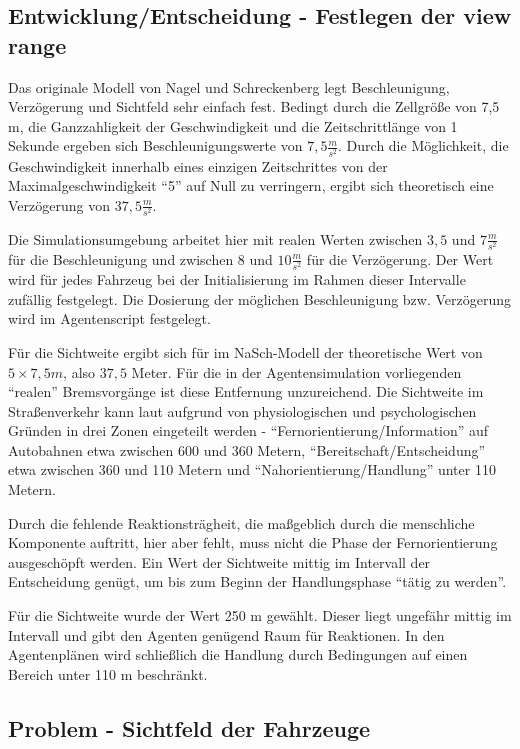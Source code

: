 \subsection{Entwicklung/Entscheidung - Festlegen der view range}

Das originale Modell von Nagel und Schreckenberg legt Beschleunigung, Verzögerung und Sichtfeld sehr einfach fest.
Bedingt durch die Zellgröße von 7,5 m, die Ganzzahligkeit der Geschwindigkeit und die Zeitschrittlänge von 1 Sekunde ergeben sich Beschleunigungswerte von $7,5 \frac{m}{s^{2}}$. 
Durch die Möglichkeit, die Geschwindigkeit innerhalb eines einzigen Zeitschrittes von der Maximalgeschwindigkeit \enquote{5} auf Null zu verringern, ergibt sich theoretisch eine Verzögerung von $37,5 \frac{m}{s^{2}}$.

Die Simulationsumgebung arbeitet hier mit realen Werten zwischen $3,5$ und $7 \frac{m}{s^{2}}$ für die Beschleunigung und zwischen $8$ und $10 \frac{m}{s^{2}}$ für die Verzögerung.
Der Wert wird für jedes Fahrzeug bei der Initialisierung im Rahmen dieser Intervalle zufällig festgelegt.
Die Dosierung der möglichen Beschleunigung bzw. Verzögerung wird im Agentenscript festgelegt.

Für die Sichtweite ergibt sich für im NaSch-Modell der theoretische Wert von $5 \times 7,5 m$, also $37,5$ Meter.
Für die in der Agentensimulation vorliegenden \enquote{realen} Bremsvorgänge ist diese Entfernung unzureichend. 
Die Sichtweite im Straßenverkehr kann laut \cite{sichtweite} aufgrund von physiologischen und psychologischen Gründen in drei Zonen eingeteilt werden - \enquote{Fernorientierung/Information} auf Autobahnen etwa zwischen 600 und 360 Metern, \enquote{Bereitschaft/Entscheidung} etwa zwischen 360 und 110 Metern und \enquote{Nahorientierung/Handlung} unter 110 Metern.

Durch die fehlende Reaktionsträgheit, die maßgeblich durch die menschliche Komponente auftritt, hier aber fehlt, muss nicht die Phase der Fernorientierung ausgeschöpft werden. 
Ein Wert der Sichtweite mittig im Intervall der Entscheidung genügt, um bis zum Beginn der Handlungsphase \enquote{tätig zu werden}.

Für die Sichtweite wurde der Wert 250 m gewählt.
Dieser liegt ungefähr mittig im Intervall und gibt den Agenten genügend Raum für Reaktionen. 
In den Agentenplänen wird schließlich die Handlung durch Bedingungen auf einen Bereich unter 110 m beschränkt.



\subsection{Problem - Sichtfeld der Fahrzeuge}


